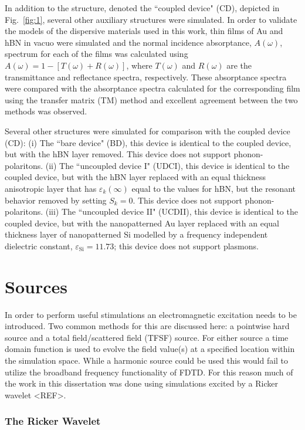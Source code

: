 \documentclass[./JimHeneghanDissertation.tex]{subfiles}
\begin{document}
			In addition to the structure, denoted the ``coupled device" (CD), depicted in Fig.~\ref{fig:1}, several other auxiliary structures were simulated. In order to validate the models of the dispersive materials used in this work, thin films of Au and hBN in vacuo were simulated and the normal incidence absorptance, $A(\omega)$, spectrum for each of the films was calculated using $A(\omega) = 1 - [T(\omega) + R(\omega)]$, where $T(\omega)$ and $R(\omega)$ are the transmittance and reflectance spectra, respectively. These absorptance spectra were compared with the absorptance spectra calculated for the corresponding film using the transfer matrix (TM) method \cite{MacLeod:01} and excellent agreement between the two methods was observed.

			Several other structures were simulated for comparison with the coupled device (CD): (i) The ``bare device" (BD), this device is identical to the coupled device, but  with the hBN layer removed. This device does not support phonon-polaritons. (ii) The  ``uncoupled device I" (UDCI), this device is identical to the coupled device, but  with the hBN layer replaced with an equal thickness anisotropic layer that has $\varepsilon_{k}(\infty)$ equal to the values for hBN, but the resonant behavior removed by setting $S_{k} = 0$. This device does not support phonon-polaritons. (iii) The ``uncoupled device II" (UCDII), this device is identical to the coupled device, but with the nanopatterned Au layer replaced with an equal thickness layer of nanopatterned Si modelled by a frequency independent dielectric constant, $\varepsilon_\mathrm{Si} = 11.73$; this device does not support plasmons.

		
		\section{Sources}
			In order to perform useful stimulations an electromagnetic excitation needs to be introduced. Two common methods for this are discussed here: a pointwise hard source and a total field/scattered field (TFSF) source. For either source a time domain function is used to evolve the field value(s) at a specified location within the simulation space. While a harmonic source could be used this would fail to utilize the broadband frequency functionality of FDTD. For this reason much of the work in this dissertation was done using simulations excited by a Ricker wavelet <REF>. 
			\subsubsection{The Ricker Wavelet}
\end{document}
